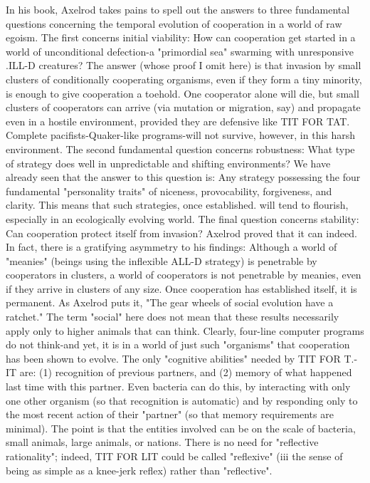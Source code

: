 In his book, Axelrod takes pains to spell out the answers to three fundamental questions
concerning the temporal evolution of cooperation in a world of raw egoism. The first
concerns initial viability: How can cooperation get started in a world of unconditional
defection-a "primordial sea" swarming with unresponsive .ILL-D creatures? The answer
(whose proof I omit here) is that invasion by small clusters of conditionally cooperating
organisms, even if they form a tiny minority, is enough to give cooperation a toehold.
One cooperator alone will die, but small clusters of cooperators can arrive (via mutation
or migration, say) and propagate even in a hostile environment, provided they are
defensive like TIT FOR TAT. Complete pacifists-Quaker-like programs-will not survive,
however, in this harsh environment.
         The second fundamental question concerns robustness: What type of strategy does
well in unpredictable and shifting environments? We have already seen that the answer to
this question is: Any strategy possessing the four fundamental "personality traits" of
niceness, provocability, forgiveness, and clarity. This means that such strategies, once
established. will tend to flourish, especially in an ecologically evolving world.
         The final question concerns stability: Can cooperation protect itself from
invasion? Axelrod proved that it can indeed. In fact, there is a gratifying asymmetry to
his findings: Although a world of "meanies" (beings using the inflexible ALL-D strategy)
is penetrable by cooperators in clusters, a world of cooperators is not penetrable by
meanies, even if they arrive in clusters of any size. Once cooperation has established
itself, it is permanent. As Axelrod puts it, "The gear wheels of social evolution have a
ratchet."
         The term "social" here does not mean that these results necessarily apply only to
higher animals that can think. Clearly, four-line computer programs do not think-and yet,
it is in a world of just such "organisms" that cooperation has been shown to evolve. The
only "cognitive abilities" needed by TIT FOR T.-IT are: (1) recognition of previous
partners, and (2) memory of what happened last time with this partner. Even bacteria can
do this, by interacting with only one other organism (so that recognition is automatic) and
by responding only to the most recent action of their "partner" (so that memory
requirements are minimal). The point is that the entities involved can be on the scale of
bacteria, small animals, large animals, or nations. There is no need for "reflective
rationality"; indeed, TIT FOR LIT could be called "reflexive" (iii the sense of being as
simple as a knee-jerk reflex) rather than "reflective".


